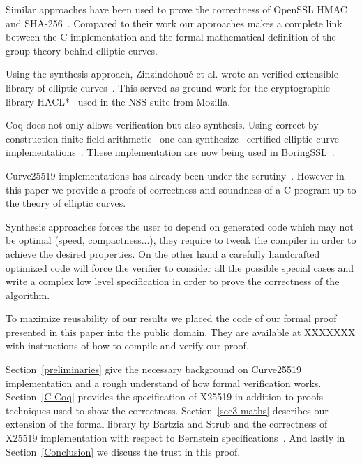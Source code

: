 
Similar approaches have been used to prove the correctness of OpenSSL
HMAC~\cite{Beringer2015VerifiedCA} and SHA-256~\cite{2015-Appel}. Compared to
their work our approaches makes a complete link between the C implementation and
the formal mathematical definition of the group theory behind elliptic curves.

Using the synthesis approach, Zinzindohou{\'{e}} et al. wrote an verified extensible
library of elliptic curves~\cite{Zinzindohoue2016AVE}. This served as ground work for the
cryptographic library HACL*~\cite{zinzindohoue2017hacl} used in the NSS suite from Mozilla.

Coq does not only allows verification but also synthesis.
Using correct-by-construction finite field arithmetic~\cite{Philipoom2018CorrectbyconstructionFF}
one can synthesize~\cite{Erbsen2016SystematicSO} certified elliptic curve
implementations~\cite{Erbsen2017CraftingCE}. These implementation are now being used in BoringSSL~\cite{fiat-crypto}.

Curve25519 implementations has already been under the scrutiny~\cite{Chen2014VerifyingCS}.
However in this paper we provide a proofs of correctness and soundness of a C program up to
the theory of elliptic curves.

Synthesis approaches forces the user to depend on generated code which may not
be optimal (speed, compactness...), they require to tweak the compiler in order
to achieve the desired properties. On the other hand a carefully handcrafted
optimized code will force the verifier to consider all the possible special cases
and write a complex low level specification in order to prove the correctness of
the algorithm.

To maximize reusability of our results we placed the code of our formal proof
presented in this paper into the public domain. They are available at XXXXXXX
with instructions of how to compile and verify our proof.

Section~\ref{preliminaries} give the necessary background on Curve25519
implementation and a rough understand of how formal verification works.
Section~\ref{C-Coq} provides the specification of X25519 in addition to proofs
techniques used to show the correctness.
Section~\ref{sec3-maths} describes our extension of the formal library by Bartzia
and Strub and the correctness of X25519 implementation with respect to Bernstein
specifications~\cite{Ber14}.
And lastly in Section~\ref{Conclusion} we discuss the trust in this proof.


